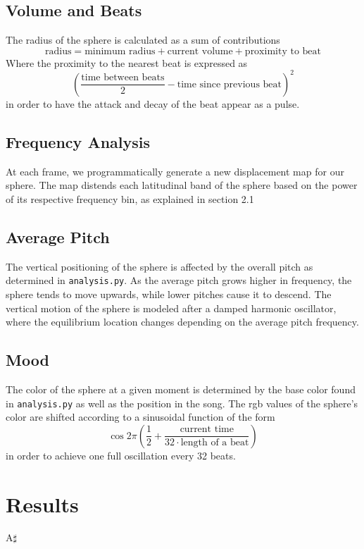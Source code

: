 \documentclass{article}
\newcommand{\code}{\texttt}
\begin{document}
    \subsection{Volume and Beats}
    The radius of the sphere is calculated as a sum of contributions
    $$\text{radius} = \text{minimum radius} + \text{current volume} + \text{proximity to beat}$$
    Where the proximity to the nearest beat is expressed as
    $$\left( \frac{\text{time between beats}}{2} - \text{time since previous beat} \right)^2$$
    in order to have the attack and decay of the beat appear as a pulse.

    \subsection{Frequency Analysis}
    At each frame, we programmatically generate a new displacement map for our sphere. The map distends each latitudinal band of the sphere based on the power of its respective frequency bin, as explained in section 2.1

    \subsection{Average Pitch}
    The vertical positioning of the sphere is affected by the overall pitch as determined in \code{analysis.py}. As the average pitch grows higher in frequency, the sphere tends to move upwards, while lower pitches cause it to descend. The vertical motion of the sphere is modeled after a damped harmonic oscillator, where the equilibrium location changes depending on the average pitch frequency.

    \subsection{Mood}
    The color of the sphere at a given moment is determined by the base color found in \code{analysis.py} as well as the position in the song. The rgb values of the sphere's color are shifted according to a sinusoidal function of the form
    $$\cos 2 \pi \left( \frac{1}{2} + \frac{\text{current time}}{32 \cdot \text{length of a beat}} \right)$$
    in order to achieve one full oscillation every 32 beats.

\section{Results}

A$\sharp$
\end{document}
